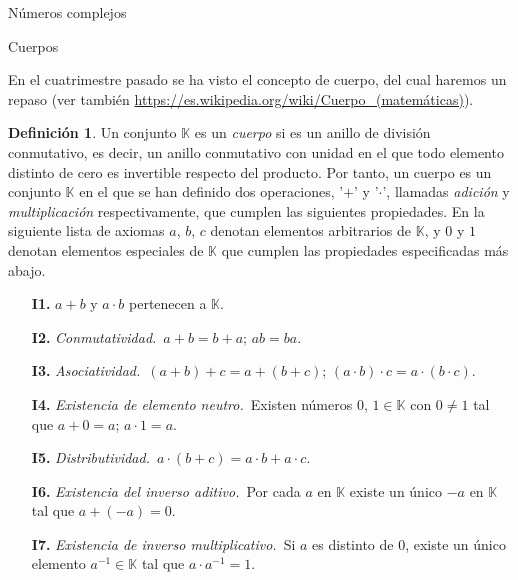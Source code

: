 \documentclass[a4paper,12pt,twoside,spanish,reqno]{amsbook}
\numberwithin{equation}{section}
\theoremstyle{definition}
\newtheorem{definicion}[teorema]{Definici\'on}
\theoremstyle{remark}
\newcommand{\K}{\mathbb K}
\begin{document}
\begin{chapter}{Números complejos}\label{chap-num-compl}
    
    \begin{section}{Cuerpos}\label{seccion-cuerpos}
        
        En el cuatrimestre pasado se ha visto el concepto de cuerpo, del cual haremos un repaso (ver también  \href{https://es.wikipedia.org/wiki/Cuerpo\_(matemáticas)}{https://es.wikipedia.org/wiki/Cuerpo\_(matemáticas)}).
        
        
        \begin{definicion}
            Un  conjunto $\K$ es un \textit{cuerpo} si es un anillo de división conmutativo, es decir, un anillo conmutativo con unidad en el que todo elemento distinto de cero es invertible respecto del producto. Por tanto,  un cuerpo es un conjunto $\K$ en el que se han definido dos operaciones, '$+$' y '$\cdot$', llamadas \textit{adición} y \textit{multiplicación} respectivamente, que cumplen las siguientes propiedades. En la siguiente lista de axiomas $a$, $b$, $c$ denotan elementos arbitrarios de $\K$, y $0$ y $1$ denotan elementos especiales de $\K$ que cumplen las propiedades especificadas más abajo.
            \begin{enumerate}
                \item[{\bf I1.}] $a+b$ y $a\cdot b$ pertenecen a ${\K}$.
                \item[{\bf I2.}] {\em Conmutatividad.}\, $a+b = b+a$; $ab=ba$. 
                \item[{\bf I3.}] {\em Asociatividad.}\, $(a+b)+c = a+(b+c)$;\; $(a\cdot b)\cdot c = a\cdot (b\cdot c)$. 
                \item[{\bf I4.}] {\em Existencia de elemento neutro.}\, Existen números $0$, $1 \in \K$ con $0\not=1$ tal que $a+0=a$; $a\cdot 1=a$. 
                \item[{\bf I5.}] {\em Distributividad.}\, $a\cdot (b+c)=a\cdot b+a\cdot c$. 
                \item[{\bf I6.}] {\em Existencia del inverso aditivo.}\, Por cada $a$ en ${\K}$ existe un único  $-a$ en ${\K}$ tal que $a+(-a)=0$. 
                \item[{\bf I7.}] {\em Existencia de inverso multiplicativo.}\, Si $a$ es distinto de 0, existe un único elemento $a^{-1} \in \K$  tal que $a\cdot a^{-1}=1$. 
            \end{enumerate}
        \end{definicion}
        

\end{section}
\end{chapter}
\end{document}
